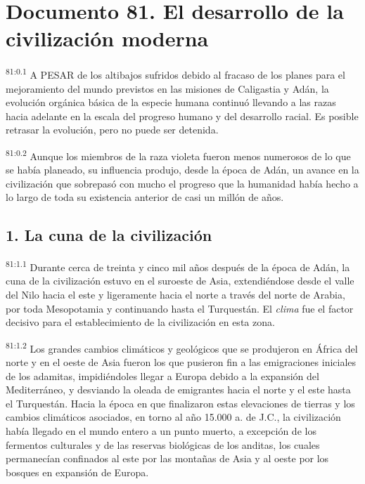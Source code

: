 \chapter{Documento 81. El desarrollo de la civilización moderna}
\par
\textsuperscript{81:0.1} A PESAR de los altibajos sufridos debido al fracaso de los planes para el mejoramiento del mundo previstos en las misiones de Caligastia y Adán, la evolución orgánica básica de la especie humana continuó llevando a las razas hacia adelante en la escala del progreso humano y del desarrollo racial. Es posible retrasar la evolución, pero no puede ser detenida.

\par
\textsuperscript{81:0.2} Aunque los miembros de la raza violeta fueron menos numerosos de lo que se había planeado, su influencia produjo, desde la época de Adán, un avance en la civilización que sobrepasó con mucho el progreso que la humanidad había hecho a lo largo de toda su existencia anterior de casi un millón de años.

\section*{1. La cuna de la civilización}
\par
\textsuperscript{81:1.1} Durante cerca de treinta y cinco mil años después de la época de Adán, la cuna de la civilización estuvo en el suroeste de Asia, extendiéndose desde el valle del Nilo hacia el este y ligeramente hacia el norte a través del norte de Arabia, por toda Mesopotamia y continuando hasta el Turquestán. El \textit{clima} fue el factor decisivo para el establecimiento de la civilización en esta zona.

\par
\textsuperscript{81:1.2} Los grandes cambios climáticos y geológicos que se produjeron en África del norte y en el oeste de Asia fueron los que pusieron fin a las emigraciones iniciales de los adamitas, impidiéndoles llegar a Europa debido a la expansión del Mediterráneo, y desviando la oleada de emigrantes hacia el norte y el este hasta el Turquestán. Hacia la época en que finalizaron estas elevaciones de tierras y los cambios climáticos asociados, en torno al año 15.000 a. de J.C., la civilización había llegado en el mundo entero a un punto muerto, a excepción de los fermentos culturales y de las reservas biológicas de los anditas, los cuales permanecían confinados al este por las montañas de Asia y al oeste por los bosques en expansión de Europa.

